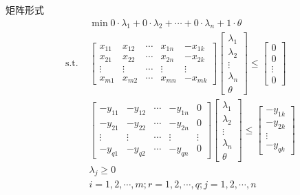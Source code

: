 \documentclass[]{beamer}
\begin{document}
\begin{frame}{矩阵形式}
    \vspace*{-0.5cm}
    \begin{align*}
        & \min 0 \cdot \lambda_1+0 \cdot \lambda_2+\cdots+0 \cdot \lambda_n+1 \cdot \theta \\
        \text { s.t. } & \left[\begin{array}{ccccc}
        x_{11} & x_{12} & \cdots & x_{1 n} & -x_{1 k} \\
        x_{21} & x_{22} & \cdots & x_{2 n} & -x_{2 k} \\
        \vdots & \vdots & \cdots & \vdots & \vdots \\
        x_{m 1} & x_{m 2} & \cdots & x_{m n} & -x_{m k}
        \end{array}\right]\left[\begin{array}{c}
        \lambda_1 \\
        \lambda_2 \\
        \vdots \\
        \lambda_n \\
        \theta
        \end{array}\right] \leq\left[\begin{array}{c}
        0 \\
        0 \\
        \vdots \\
        0
        \end{array}\right] \\
        & {\left[\begin{array}{ccccc}
        -y_{11} & -y_{12} & \cdots & -y_{1 n} & 0 \\
        -y_{21} & -y_{22} & \cdots & -y_{2 n} & 0 \\
        \vdots & \vdots & \cdots & \vdots & \vdots \\
        -y_{q 1} & -y_{q 2} & \cdots & -y_{q n} & 0
        \end{array}\right]\left[\begin{array}{c}
        \lambda_1 \\
        \lambda_2 \\
        \vdots \\
        \lambda_n \\
        \theta
        \end{array}\right] 
        \leq\left[\begin{array}{c}
        -y_{1 k} \\
        -y_{2 k} \\
        \vdots \\
        -y_{q k}
        \end{array}\right]} \\
        & \lambda_j \geq 0 \\
        & i=1,2, \cdots, m ; r=1,2, \cdots, q ; j=1,2, \cdots, n \\
        &
    \end{align*}
\end{frame}
\end{document}
